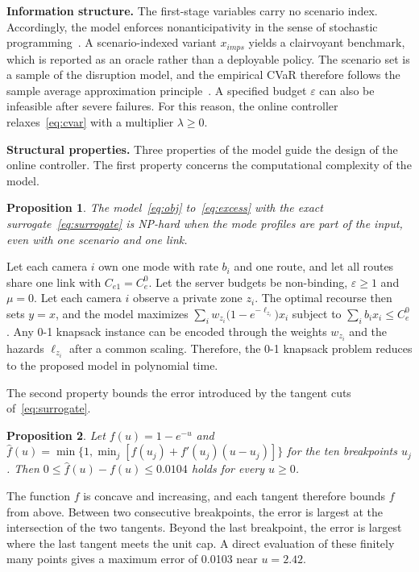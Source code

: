 \documentclass[letterpaper,journal]{IEEEtran}
\newtheorem{proposition}{Proposition}
\begin{document}
\textbf{Information structure.} The first-stage variables carry no scenario index. Accordingly, the model enforces nonanticipativity in the sense of stochastic programming~\cite{rockafellar1991scenarios,birge2011intro}. A scenario-indexed variant $x_{imps}$ yields a clairvoyant benchmark, which is reported as an oracle rather than a deployable policy. The scenario set is a sample of the disruption model, and the empirical CVaR therefore follows the sample average approximation principle~\cite{shapiro2009lectures,kleywegt2002saa}. A specified budget $\varepsilon$ can also be infeasible after severe failures. For this reason, the online controller relaxes~\eqref{eq:cvar} with a multiplier $\lambda\ge0$.

\textbf{Structural properties.} Three properties of the model guide the design of the online controller. The first property concerns the computational complexity of the model.

\begin{proposition}\label{prop:np}
The model~\eqref{eq:obj} to~\eqref{eq:excess} with the exact surrogate~\eqref{eq:surrogate} is NP-hard when the mode profiles are part of the input, even with one scenario and one link.
\end{proposition}
\begin{IEEEproof}
Let each camera $i$ own one mode with rate $b_i$ and one route, and let all routes share one link with $C_{e1}=C_e^0$. Let the server budgets be non-binding, $\varepsilon\ge1$ and $\mu=0$. Let each camera $i$ observe a private zone $z_i$. The optimal recourse then sets $y=x$, and the model maximizes $\sum_i w_{z_i}\big(1-e^{-\ell_{z_i}}\big)x_i$ subject to $\sum_i b_i x_i\le C_e^0$. Any 0-1 knapsack instance can be encoded through the weights $w_{z_i}$ and the hazards $\ell_{z_i}$ after a common scaling. Therefore, the 0-1 knapsack problem reduces to the proposed model in polynomial time.
\end{IEEEproof}

The second property bounds the error introduced by the tangent cuts of~\eqref{eq:surrogate}.

\begin{proposition}\label{prop:cuts}
Let $f(u)=1-e^{-u}$ and $\hat f(u)=\min\{1,\min_j[f(u_j)+f'(u_j)(u-u_j)]\}$ for the ten breakpoints $u_j$. Then $0\le\hat f(u)-f(u)\le0.0104$ holds for every $u\ge0$.
\end{proposition}
\begin{IEEEproof}
The function $f$ is concave and increasing, and each tangent therefore bounds $f$ from above. Between two consecutive breakpoints, the error is largest at the intersection of the two tangents. Beyond the last breakpoint, the error is largest where the last tangent meets the unit cap. A direct evaluation of these finitely many points gives a maximum error of 0.0103 near $u=2.42$.
\end{IEEEproof}
\end{document}
